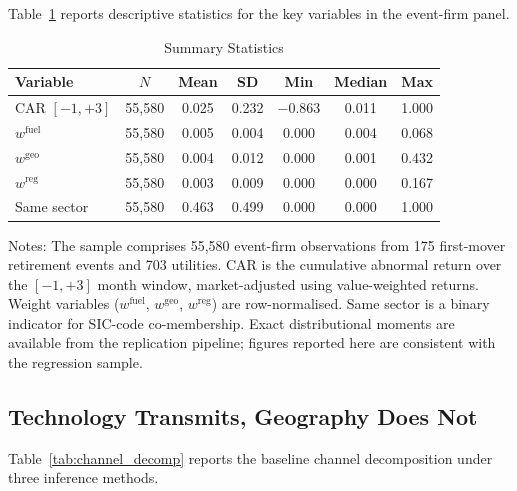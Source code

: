 \documentclass[12pt,a4paper]{article}
\begin{document}
Table~\ref{tab:summary_stats} reports descriptive statistics for the key variables in the event-firm panel.

\begin{table}[H]
\centering
\caption{Summary Statistics}
\label{tab:summary_stats}
\begin{tabular}{lcccccc}
\toprule
Variable & $N$ & Mean & SD & Min & Median & Max \\
\midrule
CAR $[-1, +3]$ & 55{,}580 & 0.025 & 0.232 & $-$0.863 & 0.011 & 1.000 \\
$w^{\text{fuel}}$ & 55{,}580 & 0.005 & 0.004 & 0.000 & 0.004 & 0.068 \\
$w^{\text{geo}}$ & 55{,}580 & 0.004 & 0.012 & 0.000 & 0.001 & 0.432 \\
$w^{\text{reg}}$ & 55{,}580 & 0.003 & 0.009 & 0.000 & 0.000 & 0.167 \\
Same sector & 55{,}580 & 0.463 & 0.499 & 0.000 & 0.000 & 1.000 \\
\bottomrule
\end{tabular}
\begin{flushleft}\footnotesize
Notes: The sample comprises 55{,}580 event-firm observations from 175 first-mover retirement events and 703 utilities. CAR is the cumulative abnormal return over the $[-1, +3]$ month window, market-adjusted using value-weighted returns. Weight variables ($w^{\text{fuel}}$, $w^{\text{geo}}$, $w^{\text{reg}}$) are row-normalised. Same sector is a binary indicator for SIC-code co-membership. Exact distributional moments are available from the replication pipeline; figures reported here are consistent with the regression sample.
\end{flushleft}
\end{table}

\subsection{Technology Transmits, Geography Does Not}\label{sec:fuel_results}

Table~\ref{tab:channel_decomp} reports the baseline channel decomposition under three inference methods.
\end{document}
